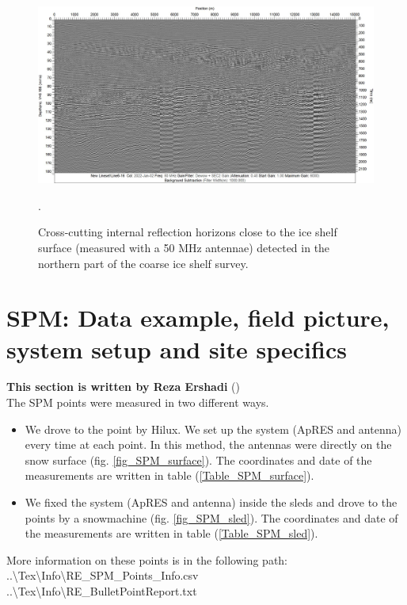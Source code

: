 \documentclass[a4paper,12pt]{article}
\begin{document}
\begin{figure}[H]
\includegraphics[width=\linewidth]{Figures/PulseEkko/Line6-16-greyr.jpg}
\caption{Cross-cutting internal reflection horizons close to the ice shelf surface (measured with a 50 MHz antennae) detected in the northern part of the coarse ice shelf survey.}.
\label{fig_IRH2}
\end{figure}
\pagebreak
\section{SPM: Data example, field picture, system setup and site specifics}
\label{SecSPM}
\textbf{This section is written by Reza Ershadi}
(\href{mailto:mohammadreza.ershadi@uni-tuebingen.de}{\color{blue}{Email Me}})\\

The SPM points were measured in two different ways.
\begin{itemize}
\item We drove to the point by
Hilux. We set up the system (ApRES and antenna) every time at each point. In
this method, the antennas were directly on the snow surface (fig. \ref{fig_SPM_surface}). The
coordinates and date of the measurements are written in table (\ref{Table_SPM_surface}).
\item We fixed the system (ApRES and antenna) inside the sleds and drove to the points by a
snowmachine (fig. \ref{fig_SPM_sled}). The coordinates and date of the measurements are written in
table (\ref{Table_SPM_sled}).
\end{itemize}
More information on these points is in the following path:\\
..\textbackslash Tex\textbackslash Info\textbackslash RE\_SPM\_Points\_Info.csv\\
..\textbackslash Tex\textbackslash Info\textbackslash RE\_BulletPointReport.txt
\end{document}
